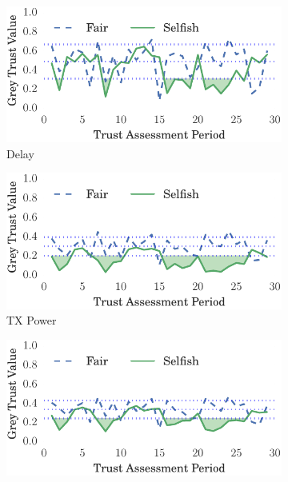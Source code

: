 \documentclass[runningheads,a4paper]{llncs}
\begin{document}
\begin{figure}[h]
\begin{subfigure}{0.5\textwidth}
  \centering
  \includegraphics[width=.95\linewidth]{img/trust_bella_static_emph_ADelay_BadMouthingPowerControl.pdf}
  \caption{Delay}
  \label{fig:static_badmouthing_delay}
\end{subfigure}
\begin{subfigure}{0.5\textwidth}
\centering
  \includegraphics[width=.95\linewidth]{img/trust_bella_static_emph_ATXP_BadMouthingPowerControl.pdf}
  \caption{TX Power}
  \label{fig:static_badmouthing_txp}
\end{subfigure}
\begin{subfigure}{0.5\textwidth}
\centering
  \includegraphics[width=.95\linewidth]{img/trust_bella_static_emph_RXThroughput_BadMouthingPowerControl.pdf}

\end{subfigure}
\end{figure}
\end{document}
